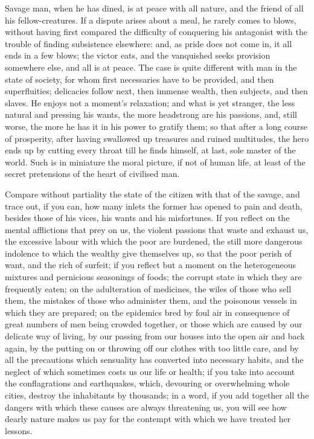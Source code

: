 \documentclass[12pt]{report}
\begin{document}
Savage man, when he has dined, is at peace with all nature, and the friend of all his fellow-creatures. If a dispute arises about a meal, he rarely comes to blows, without having first compared the difficulty of conquering his antagonist with the trouble of finding subsistence elsewhere: and, as pride does not come in, it all ends in a few blows; the victor eats, and the vanquished seeks provision somewhere else, and all is at peace. The case is quite different with man in the state of society, for whom first necessaries have to be provided, and then superfluities; delicacies follow next, then immense wealth, then subjects, and then slaves. He enjoys not a moment's relaxation; and what is yet stranger, the less natural and pressing his wants, the more headstrong are his passions, and, still worse, the more he has it in his power to gratify them; so that after a long course of prosperity, after having swallowed up treasures and ruined multitudes, the hero ends up by cutting every throat till he finds himself, at last, sole master of the world. Such is in miniature the moral picture, if not of human life, at least of the secret pretensions of the heart of civilised man.

Compare without partiality the state of the citizen with that of the savage, and trace out, if you can, how many inlets the former has opened to pain and death, besides those of his vices, his wants and his misfortunes. If you reflect on the mental afflictions that prey on us, the violent passions that waste and exhaust us, the excessive labour with which the poor are burdened, the still more dangerous indolence to which the wealthy give themselves up, so that the poor perish of want, and the rich of surfeit; if you reflect but a moment on the heterogeneous mixtures and pernicious seasonings of foods; the corrupt state in which they are frequently eaten; on the adulteration of medicines, the wiles of those who sell them, the mistakes of those who administer them, and the poisonous vessels in which they are prepared; on the epidemics bred by foul air in consequence of great numbers of men being crowded together, or those which are caused by our delicate way of living, by our passing from our houses into the open air and back again, by the putting on or throwing off our clothes with too little care, and by all the precautions which sensuality has converted into necessary habits, and the neglect of which sometimes costs us our life or health; if you take into account the conflagrations and earthquakes, which, devouring or overwhelming whole cities, destroy the inhabitants by thousands; in a word, if you add together all the dangers with which these causes are always threatening us, you will see how dearly nature makes us pay for the contempt with which we have treated her lessons.
\end{document}

